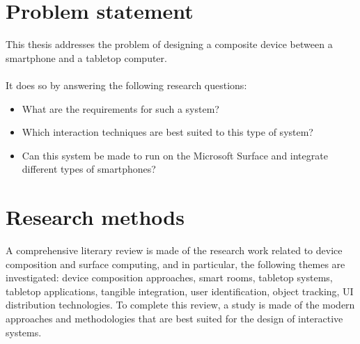 %

\section{Problem statement}

This thesis addresses the problem of designing a composite device between a smartphone and a tabletop computer.
\\\\
It does so by answering the following research questions:
\begin{itemize}
\item What are the requirements for such a system?
\item Which interaction techniques are best suited to this type of system?
\item Can this system be made to run on the Microsoft Surface and integrate different types of smartphones?
\end{itemize}

\section{Research methods}

A comprehensive literary review is made of the research work related to device composition and surface computing, and in particular, the following themes are investigated: device composition approaches, smart rooms, tabletop systems, tabletop applications, tangible integration, user identification, object tracking, UI distribution technologies.
To complete this review, a study is made of the modern approaches and methodologies that are best suited for the design of interactive systems.

